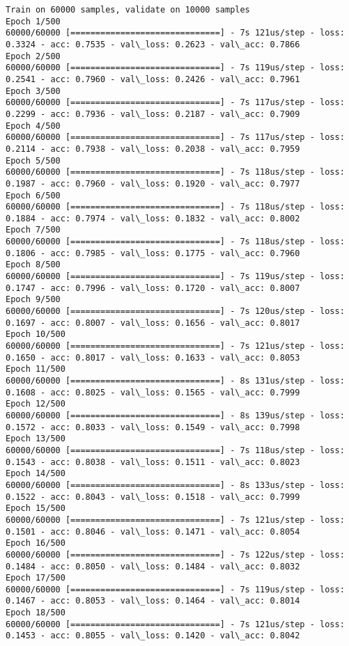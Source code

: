 \documentclass[11pt]{article}
\begin{document}
    \begin{Verbatim}[commandchars=\\\{\}]
Train on 60000 samples, validate on 10000 samples
Epoch 1/500
60000/60000 [==============================] - 7s 121us/step - loss: 0.3324 - acc: 0.7535 - val\_loss: 0.2623 - val\_acc: 0.7866
Epoch 2/500
60000/60000 [==============================] - 7s 119us/step - loss: 0.2541 - acc: 0.7960 - val\_loss: 0.2426 - val\_acc: 0.7961
Epoch 3/500
60000/60000 [==============================] - 7s 117us/step - loss: 0.2299 - acc: 0.7936 - val\_loss: 0.2187 - val\_acc: 0.7909
Epoch 4/500
60000/60000 [==============================] - 7s 117us/step - loss: 0.2114 - acc: 0.7938 - val\_loss: 0.2038 - val\_acc: 0.7959
Epoch 5/500
60000/60000 [==============================] - 7s 118us/step - loss: 0.1987 - acc: 0.7960 - val\_loss: 0.1920 - val\_acc: 0.7977
Epoch 6/500
60000/60000 [==============================] - 7s 118us/step - loss: 0.1884 - acc: 0.7974 - val\_loss: 0.1832 - val\_acc: 0.8002
Epoch 7/500
60000/60000 [==============================] - 7s 118us/step - loss: 0.1806 - acc: 0.7985 - val\_loss: 0.1775 - val\_acc: 0.7960
Epoch 8/500
60000/60000 [==============================] - 7s 119us/step - loss: 0.1747 - acc: 0.7996 - val\_loss: 0.1720 - val\_acc: 0.8007
Epoch 9/500
60000/60000 [==============================] - 7s 120us/step - loss: 0.1697 - acc: 0.8007 - val\_loss: 0.1656 - val\_acc: 0.8017
Epoch 10/500
60000/60000 [==============================] - 7s 121us/step - loss: 0.1650 - acc: 0.8017 - val\_loss: 0.1633 - val\_acc: 0.8053
Epoch 11/500
60000/60000 [==============================] - 8s 131us/step - loss: 0.1608 - acc: 0.8025 - val\_loss: 0.1565 - val\_acc: 0.7999
Epoch 12/500
60000/60000 [==============================] - 8s 139us/step - loss: 0.1572 - acc: 0.8033 - val\_loss: 0.1549 - val\_acc: 0.7998
Epoch 13/500
60000/60000 [==============================] - 7s 118us/step - loss: 0.1543 - acc: 0.8038 - val\_loss: 0.1511 - val\_acc: 0.8023
Epoch 14/500
60000/60000 [==============================] - 8s 133us/step - loss: 0.1522 - acc: 0.8043 - val\_loss: 0.1518 - val\_acc: 0.7999
Epoch 15/500
60000/60000 [==============================] - 7s 121us/step - loss: 0.1501 - acc: 0.8046 - val\_loss: 0.1471 - val\_acc: 0.8054
Epoch 16/500
60000/60000 [==============================] - 7s 122us/step - loss: 0.1484 - acc: 0.8050 - val\_loss: 0.1484 - val\_acc: 0.8032
Epoch 17/500
60000/60000 [==============================] - 7s 119us/step - loss: 0.1467 - acc: 0.8053 - val\_loss: 0.1464 - val\_acc: 0.8014
Epoch 18/500
60000/60000 [==============================] - 7s 121us/step - loss: 0.1453 - acc: 0.8055 - val\_loss: 0.1420 - val\_acc: 0.8042

\end{Verbatim}
\end{document}
